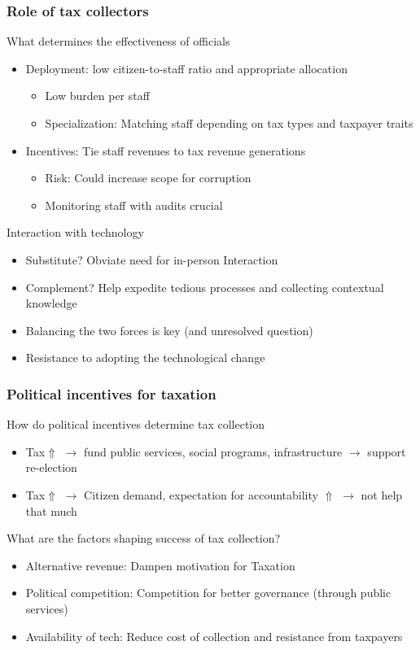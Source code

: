 \documentclass[aspectratio=169]{beamer}
\begin{document}
\begin{frame}
\frametitle{Role of tax collectors} 
What determines the effectiveness of officials
\begin{itemize}\setlength\itemsep{3pt}
\item Deployment: low citizen-to-staff ratio and appropriate allocation
\begin{itemize}\setlength\itemsep{3pt}
\item Low burden per staff
\item Specialization: Matching staff depending on tax types and taxpayer traits 
\end{itemize}
\item Incentives: Tie staff revenues to tax revenue generations
 \begin{itemize}\setlength\itemsep{3pt}
\item Risk: Could increase scope for corruption
\item Monitoring staff with audits crucial 
\end{itemize}
\end{itemize}\medskip
Interaction with technology
\begin{itemize}\setlength\itemsep{3pt}
\item Substitute? Obviate need for in-person Interaction
\item Complement? Help expedite tedious processes and collecting contextual knowledge
\item Balancing the two forces is key (and unresolved question)
\item Resistance to adopting the technological change
\end{itemize}\medskip
\end{frame}


\begin{frame}
\frametitle{Political incentives for taxation} 
How do political incentives determine tax collection
\begin{itemize}\setlength\itemsep{3pt}
\item Tax$\Uparrow$ $\to$ fund public services, social programs, infrastructure $\to$ support re-election
\item Tax$\Uparrow$ $\to$ Citizen demand, expectation for accountability $\Uparrow$ $\to$ not help that much
\end{itemize} \medskip
What are the factors shaping success of tax collection?
\begin{itemize}
\item Alternative revenue: Dampen motivation for Taxation
\item Political competition: Competition for better governance (through public services)
\item Availability of tech: Reduce cost of collection and resistance from taxpayers
\end{itemize}

\end{frame}
\end{document}
